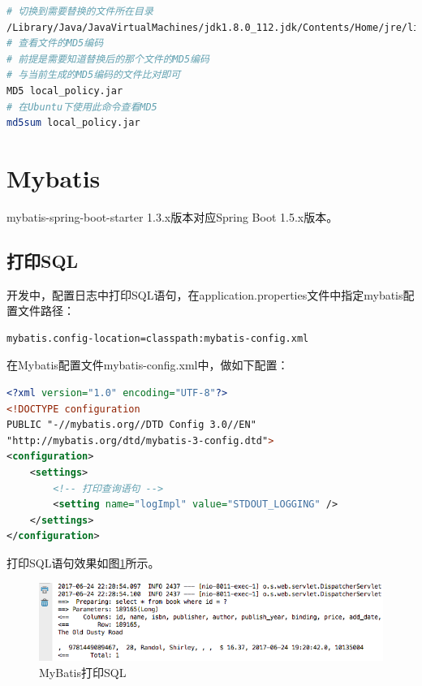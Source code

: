 \documentclass[letter]{book}
\begin{document}
\begin{lstlisting}[language=Bash]
# 切换到需要替换的文件所在目录
/Library/Java/JavaVirtualMachines/jdk1.8.0_112.jdk/Contents/Home/jre/lib/security/
# 查看文件的MD5编码
# 前提是需要知道替换后的那个文件的MD5编码
# 与当前生成的MD5编码的文件比对即可
MD5 local_policy.jar
# 在Ubuntu下使用此命令查看MD5
md5sum local_policy.jar
\end{lstlisting}




\section{Mybatis}

mybatis-spring-boot-starter 1.3.x版本对应Spring Boot 1.5.x版本。


\subsection{打印SQL}

开发中，配置日志中打印SQL语句，在application.properties文件中指定mybatis配置文件路径：

\begin{lstlisting}[language=Bash]
mybatis.config-location=classpath:mybatis-config.xml
\end{lstlisting}

在Mybatis配置文件mybatis-config.xml中，做如下配置：

\begin{lstlisting}[language=XML]
<?xml version="1.0" encoding="UTF-8"?>
<!DOCTYPE configuration
PUBLIC "-//mybatis.org//DTD Config 3.0//EN"
"http://mybatis.org/dtd/mybatis-3-config.dtd">
<configuration>
	<settings>
		<!-- 打印查询语句 -->
		<setting name="logImpl" value="STDOUT_LOGGING" />
	</settings>
</configuration>
\end{lstlisting}

打印SQL语句效果如图\ref{fig:mybatisprintsql}所示。

\begin{figure}[htbp]
	\centering
	\includegraphics[scale=0.5]{mybatisprintsql.png}
	\caption{MyBatis打印SQL}
	\label{fig:mybatisprintsql}
\end{figure}
\end{document}
